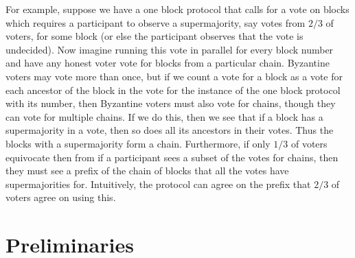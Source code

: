 \documentclass{article}
\begin{document}
For example, suppose we have a one block protocol that calls for a vote on blocks which requires a participant to observe a supermajority, say votes from  $2/3$ of voters, for some block (or else the participant observes that the vote is undecided). Now imagine running this vote in parallel for every block number and have any honest voter vote for blocks from a particular chain. Byzantine voters may vote more than once, but if we count a vote for a block as a vote for each ancestor of the block in the vote for the instance of the one block protocol with its number, then Byzantine voters must also vote for chains, though they can vote for multiple chains. If we do this, then we see that if a block has a supermajority in a vote, then so does all its ancestors in their votes. Thus the blocks with a  supermajority form a chain. Furthermore, if only $1/3$ of voters equivocate then from if a participant sees a subset of the votes for chains, then they must see a prefix of the chain of blocks that all the votes have supermajorities for. Intuitively, the protocol can agree on the prefix that $2/3$ of voters agree on using this.










\section{Preliminaries} \label{sec:prelims}
\end{document}
